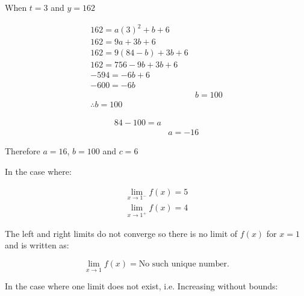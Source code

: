 \documentclass[12pt letter]{report}
\begin{document}
When $t=3$ and $y=162$

\begin{align*}
	162 = a(3)^2 + b + 6     \\
	162 = 9a + 3b + 6        \\
	162 = 9(84 - b) + 3b + 6 \\
	162 = 756 - 9b +3b +6    \\
	-594 = -6b +6            \\
	-600 = -6b               \\
	 & b = 100               \\[20pt]
	\therefore b = 100
\end{align*}

\begin{align*}
	84 - 100 = a \\
	 & a = -16
\end{align*}

Therefore $a=16$, $b=100$ and $c=6$


\noindent\large{In the case where:}

\begin{align*}
	\lim_{x\to1^-} f(x) = 5 \\
	\lim_{x\to1^+} f(x) = 4
\end{align*}

\noindent The left and right limits do not converge so there is no limit of $f(x)$ for $x = 1$ and is written as:

\[
	\lim_{x\to1} f(x) = \text{No such unique number}
	.\]
\pagebreak

\noindent\large{In the case where one limit does not exist, i.e. Increasing without bounds:}
\end{document}
